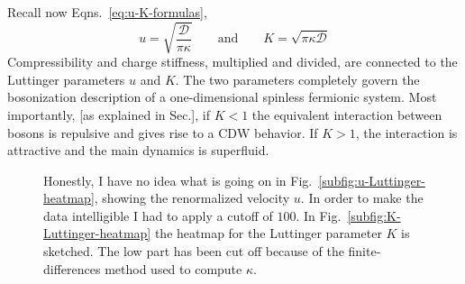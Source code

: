 Recall now Eqns.~\eqref{eq:u-K-formulas},
\[
	u = \sqrt{\frac{\mathcal{D}}{\pi\kappa}}
	\qquad\text{and}\qquad
	K = \sqrt{\pi\kappa\mathcal{D}}
\]
Compressibility and charge stiffness, multiplied and divided, are connected to the Luttinger parameters $u$ and $K$. The two parameters completely govern the bosonization description of a one-dimensional spinless fermionic system. Most importantly, {\color{tabred} [as explained in Sec.]}, if $K < 1$ the equivalent interaction between bosons is repulsive and gives rise to a $\mathrm{CDW}$ behavior. If $K > 1$, the interaction is attractive and the main dynamics is superfluid.

\begin{figure}
	\centering	
	\caption{Honestly, I have no idea what is going on in Fig.~\ref{subfig:u-Luttinger-heatmap}, showing the renormalized velocity $u$. In order to make the data intelligible I had to apply a cutoff of $100$. In Fig.~\ref{subfig:K-Luttinger-heatmap} the heatmap for the Luttinger parameter $K$ is sketched. The low part has been cut off because of the finite-differences method used to compute $\kappa$.}
	\label{fig:Luttinger-heatmaps}
\end{figure}

